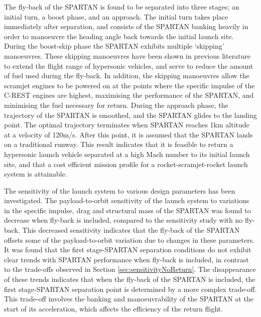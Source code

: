 The fly-back of the SPARTAN is found to be separated into three stages; an initial turn, a boost phase, and an approach. 
The initial turn takes place immediately after separation, and consists of the SPARTAN banking heavily in order to manoeuvre the heading angle back towards the initial launch site. 
During the boost-skip phase the SPARTAN exhibits multiple `skipping' manoeuvres. These skipping manoeuvres have been shown in previous literature to extend the flight range of hypersonic vehicles\cite{Moshman2014,Darby2011,Toso2015,Tetlow1992,Eggers1957,Kanda2007,Chai2015}, and serve to reduce the amount of fuel used during the fly-back.
In addition, the skipping manoeuvres allow the scramjet engines to be powered on at the points where the specific impulse of the C-REST engines are highest, maximising the performance of the SPARTAN, and minimising the fuel necessary for return. 
During the approach phase, the trajectory of the SPARTAN is smoothed, and the SPARTAN glides to the landing point. 
 The optimal trajectory terminates when SPARTAN reaches 1km altitude at a velocity of 120m/s. After this point, it is assumed that the SPARTAN lands on a traditional runway.  
This result indicates that it is feasible to return a hypersonic launch vehicle separated at a high Mach number to its initial launch site, and that a cost efficient mission profile for a rocket-scramjet-rocket launch system is attainable.  

The sensitivity of the launch system to various design parameters has been investigated. 
The payload-to-orbit sensitivity of the launch system to variations in the specific impulse, drag and structural mass of the SPARTAN was found to decrease when fly-back is included, compared to the sensitivity study with no fly-back. This decreased sensitivity indicates that the fly-back of the SPARTAN offsets some of the payload-to-orbit variation due to changes in these parameters. 
It was found that the first stage-SPARTAN separation conditions do not exhibit clear trends with SPARTAN performance when fly-back is included, in contrast to the trade-offs observed in Section \ref{sec:sensitivityNoReturn}. The disappearance of these trends indicates that when the fly-back of the SPARTAN is included, the first stage-SPARTAN separation point is determined by a more complex trade-off. This trade-off involves the banking and manoeuvrability of the SPARTAN at the start of its acceleration, which affects the efficiency of the return flight. 

